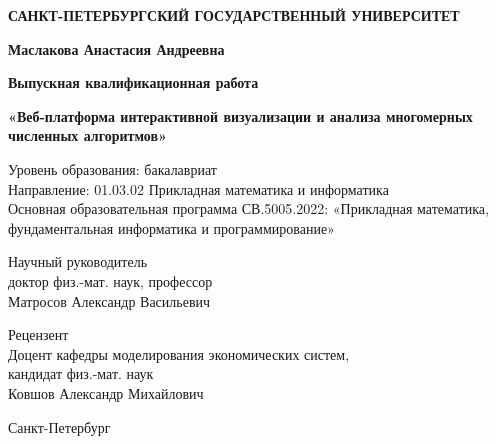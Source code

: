 \documentclass[12pt, oneside]{book}
\begin{document}
\thispagestyle{empty}
\begin{center}
        \textbf{САНКТ-ПЕТЕРБУРГСКИЙ ГОСУДАРСТВЕННЫЙ УНИВЕРСИТЕТ}

        \vspace{0.5em}
        
        \vspace{0.6em}
        
        


        \vspace{7em}
        \textbf{\large Маслакова Анастасия Андреевна}

        \vspace{2em}
        \textbf{\Large Выпускная квалификационная работа}
        
        \vspace{2.5em}
        \textbf{\Large «Веб-платформа интерактивной визуализации и анализа многомерных численных алгоритмов»}

        \vspace{4em}
        Уровень образования: бакалавриат \\
        Направление: 01.03.02 Прикладная математика и информатика \\
        Основная образовательная программа СВ.5005.2022:
        «Прикладная математика, фундаментальная информатика и программирование»

        \vspace{4em}
        \begin{flushright}
                Научный руководитель \\
                доктор физ.-мат. наук, профессор \\
                Матросов Александр Васильевич
        \end{flushright}

        \begin{flushright}
                Рецензент \\
                Доцент кафедры моделирования экономических   систем, \\
                кандидат физ.-мат. наук \\
                Ковшов Александр Михайлович
        \end{flushright}

        \vfill
        Санкт-Петербург\\ \the\year
\end{center}
\end{document}

